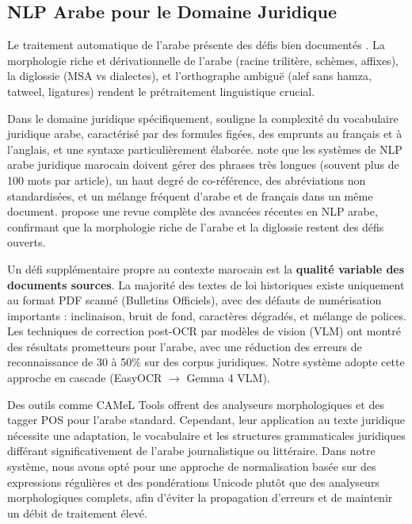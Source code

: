 \subsection{NLP Arabe pour le Domaine Juridique}

Le traitement automatique de l'arabe présente des défis bien documentés
\cite{habash2010arabic}. La morphologie riche et dérivationnelle de l'arabe
(racine trilitère, schèmes, affixes), la diglossie (MSA vs dialectes), et
l'orthographe ambiguë (alef sans hamza, tatweel, ligatures) rendent le
prétraitement linguistique crucial.

\vspace{0.2cm}

\noindent Dans le domaine juridique spécifiquement, \cite{zaghouani2021arabic}
souligne la complexité du vocabulaire juridique arabe, caractérisé par des
formules figées, des emprunts au français et à l'anglais, et une syntaxe
particulièrement élaborée. \cite{benali2025moroccan} note que les systèmes
de NLP arabe juridique marocain doivent gérer des phrases très longues (souvent plus
de 100 mots par article), un haut degré de co-référence, des
abréviations non standardisées, et un mélange fréquent d'arabe et de français
dans un même document. \cite{nassif2024arabic} propose une revue complète
des avancées récentes en NLP arabe, confirmant que la morphologie riche
de l'arabe et la diglossie restent des défis ouverts.

\vspace{0.2cm}

\noindent Un défi supplémentaire propre au contexte marocain est la
\textbf{qualité variable des documents sources}. La majorité des textes
de loi historiques existe uniquement au format PDF scanné (Bulletins
Officiels), avec des défauts de numérisation importants : inclinaison,
bruit de fond, caractères dégradés, et mélange de polices. Les techniques
de correction post-OCR par modèles de vision (VLM) \cite{benajiba2023arabic}
ont montré des résultats prometteurs pour l'arabe, avec une réduction des
erreurs de reconnaissance de 30 à 50\% sur des corpus juridiques. Notre
système adopte cette approche en cascade (EasyOCR $\rightarrow$ Gemma 4 VLM).

\vspace{0.2cm}

\noindent Des outils comme CAMeL Tools \cite{obaraj2021cameltools} offrent
des analyseurs morphologiques et des tagger POS pour l'arabe standard.
Cependant, leur application au texte juridique nécessite une adaptation,
le vocabulaire et les structures grammaticales juridiques différant
significativement de l'arabe journalistique ou littéraire. Dans notre système, nous avons opté pour une
approche de normalisation basée sur des expressions régulières et des
pondérations Unicode plutôt que des analyseurs morphologiques complets,
afin d'éviter la propagation d'erreurs et de maintenir un débit de
traitement élevé.

